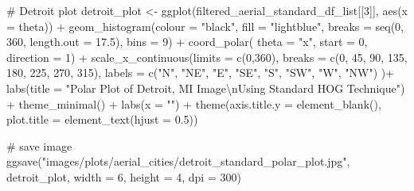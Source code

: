 \documentclass[
  letterpaper,
  DIV=11,
  numbers=noendperiod]{scrreprt}
\newenvironment{Shaded}{\begin{snugshade}}{\end{snugshade}}
\newcommand{\AttributeTok}[1]{\textcolor[rgb]{0.40,0.45,0.13}{#1}}
\newcommand{\CommentTok}[1]{\textcolor[rgb]{0.37,0.37,0.37}{#1}}
\newcommand{\DecValTok}[1]{\textcolor[rgb]{0.68,0.00,0.00}{#1}}
\newcommand{\FloatTok}[1]{\textcolor[rgb]{0.68,0.00,0.00}{#1}}
\newcommand{\FunctionTok}[1]{\textcolor[rgb]{0.28,0.35,0.67}{#1}}
\newcommand{\NormalTok}[1]{\textcolor[rgb]{0.00,0.23,0.31}{#1}}
\newcommand{\OtherTok}[1]{\textcolor[rgb]{0.00,0.23,0.31}{#1}}
\newcommand{\SpecialCharTok}[1]{\textcolor[rgb]{0.37,0.37,0.37}{#1}}
\newcommand{\StringTok}[1]{\textcolor[rgb]{0.13,0.47,0.30}{#1}}
\begin{document}
\begin{Shaded}
\begin{Highlighting}[]
\CommentTok{\# Detroit plot}
\NormalTok{detroit\_plot }\OtherTok{\textless{}{-}}
  \FunctionTok{ggplot}\NormalTok{(filtered\_aerial\_standard\_df\_list[[}\DecValTok{3}\NormalTok{]], }
         \FunctionTok{aes}\NormalTok{(}\AttributeTok{x =}\NormalTok{ theta)) }\SpecialCharTok{+}
  \FunctionTok{geom\_histogram}\NormalTok{(}\AttributeTok{colour =} \StringTok{"black"}\NormalTok{, }
                 \AttributeTok{fill =} \StringTok{"lightblue"}\NormalTok{, }
                 \AttributeTok{breaks =} \FunctionTok{seq}\NormalTok{(}\DecValTok{0}\NormalTok{, }\DecValTok{360}\NormalTok{, }\AttributeTok{length.out =} \FloatTok{17.5}\NormalTok{),}
                 \AttributeTok{bins =} \DecValTok{9}\NormalTok{) }\SpecialCharTok{+}
  \FunctionTok{coord\_polar}\NormalTok{(}
    \AttributeTok{theta =} \StringTok{"x"}\NormalTok{, }
    \AttributeTok{start =} \DecValTok{0}\NormalTok{, }
    \AttributeTok{direction =} \DecValTok{1}\NormalTok{) }\SpecialCharTok{+}
  \FunctionTok{scale\_x\_continuous}\NormalTok{(}\AttributeTok{limits =} \FunctionTok{c}\NormalTok{(}\DecValTok{0}\NormalTok{,}\DecValTok{360}\NormalTok{),}
    \AttributeTok{breaks =} \FunctionTok{c}\NormalTok{(}\DecValTok{0}\NormalTok{, }\DecValTok{45}\NormalTok{, }\DecValTok{90}\NormalTok{, }\DecValTok{135}\NormalTok{, }\DecValTok{180}\NormalTok{, }\DecValTok{225}\NormalTok{, }\DecValTok{270}\NormalTok{, }\DecValTok{315}\NormalTok{), }
    \AttributeTok{labels =} \FunctionTok{c}\NormalTok{(}\StringTok{"N"}\NormalTok{, }\StringTok{"NE"}\NormalTok{, }\StringTok{"E"}\NormalTok{, }\StringTok{"SE"}\NormalTok{, }\StringTok{"S"}\NormalTok{, }\StringTok{"SW"}\NormalTok{, }\StringTok{"W"}\NormalTok{, }\StringTok{"NW"}\NormalTok{)}
\NormalTok{  )}\SpecialCharTok{+}
  \FunctionTok{labs}\NormalTok{(}\AttributeTok{title =} \StringTok{"Polar Plot of Detroit, MI Image}\SpecialCharTok{\textbackslash{}n}\StringTok{Using Standard HOG Technique"}\NormalTok{) }\SpecialCharTok{+}
  \FunctionTok{theme\_minimal}\NormalTok{() }\SpecialCharTok{+}
  \FunctionTok{labs}\NormalTok{(}\AttributeTok{x =} \StringTok{""}\NormalTok{) }\SpecialCharTok{+}
  \FunctionTok{theme}\NormalTok{(}\AttributeTok{axis.title.y =} \FunctionTok{element\_blank}\NormalTok{(),}
        \AttributeTok{plot.title =} \FunctionTok{element\_text}\NormalTok{(}\AttributeTok{hjust =} \FloatTok{0.5}\NormalTok{))}

\CommentTok{\# save image}
\FunctionTok{ggsave}\NormalTok{(}\StringTok{"images/plots/aerial\_cities/detroit\_standard\_polar\_plot.jpg"}\NormalTok{, detroit\_plot, }\AttributeTok{width =} \DecValTok{6}\NormalTok{, }\AttributeTok{height =} \DecValTok{4}\NormalTok{, }\AttributeTok{dpi =} \DecValTok{300}\NormalTok{)}
\end{Highlighting}
\end{Shaded}
\end{document}
